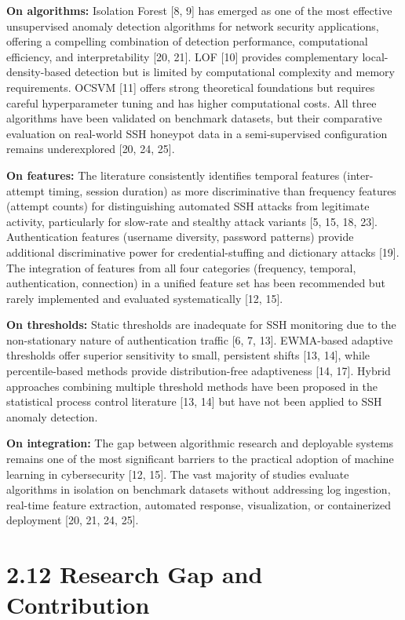 \documentclass[
  a4paper]{report}
\begin{document}
\textbf{On algorithms:} Isolation Forest {[}8, 9{]} has emerged as one
of the most effective unsupervised anomaly detection algorithms for
network security applications, offering a compelling combination of
detection performance, computational efficiency, and interpretability
{[}20, 21{]}. LOF {[}10{]} provides complementary local-density-based
detection but is limited by computational complexity and memory
requirements. OCSVM {[}11{]} offers strong theoretical foundations but
requires careful hyperparameter tuning and has higher computational
costs. All three algorithms have been validated on benchmark datasets,
but their comparative evaluation on real-world SSH honeypot data in a
semi-supervised configuration remains underexplored {[}20, 24, 25{]}.

\textbf{On features:} The literature consistently identifies temporal
features (inter-attempt timing, session duration) as more discriminative
than frequency features (attempt counts) for distinguishing automated
SSH attacks from legitimate activity, particularly for slow-rate and
stealthy attack variants {[}5, 15, 18, 23{]}. Authentication features
(username diversity, password patterns) provide additional
discriminative power for credential-stuffing and dictionary attacks
{[}19{]}. The integration of features from all four categories
(frequency, temporal, authentication, connection) in a unified feature
set has been recommended but rarely implemented and evaluated
systematically {[}12, 15{]}.

\textbf{On thresholds:} Static thresholds are inadequate for SSH
monitoring due to the non-stationary nature of authentication traffic
{[}6, 7, 13{]}. EWMA-based adaptive thresholds offer superior
sensitivity to small, persistent shifts {[}13, 14{]}, while
percentile-based methods provide distribution-free adaptiveness {[}14,
17{]}. Hybrid approaches combining multiple threshold methods have been
proposed in the statistical process control literature {[}13, 14{]} but
have not been applied to SSH anomaly detection.

\textbf{On integration:} The gap between algorithmic research and
deployable systems remains one of the most significant barriers to the
practical adoption of machine learning in cybersecurity {[}12, 15{]}.
The vast majority of studies evaluate algorithms in isolation on
benchmark datasets without addressing log ingestion, real-time feature
extraction, automated response, visualization, or containerized
deployment {[}20, 21, 24, 25{]}.

\section{2.12 Research Gap and
Contribution}\label{research-gap-and-contribution}
\end{document}
